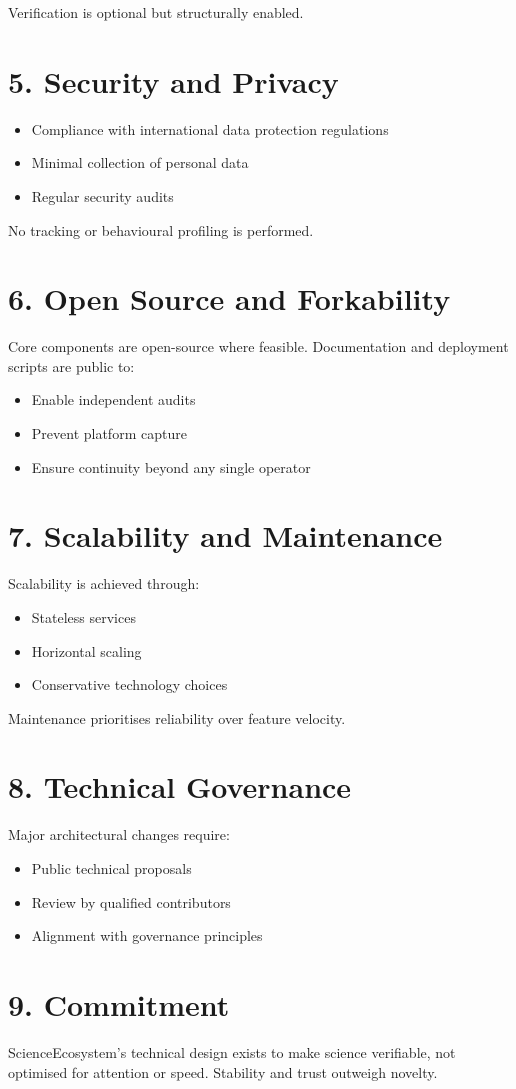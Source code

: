 Verification is optional but structurally enabled.

\section*{5. Security and Privacy}

\begin{itemize}
    \item Compliance with international data protection regulations
    \item Minimal collection of personal data
    \item Regular security audits
\end{itemize}

No tracking or behavioural profiling is performed.

\section*{6. Open Source and Forkability}

Core components are open-source where feasible. Documentation and deployment scripts are public to:
\begin{itemize}
    \item Enable independent audits
    \item Prevent platform capture
    \item Ensure continuity beyond any single operator
\end{itemize}

\section*{7. Scalability and Maintenance}

Scalability is achieved through:
\begin{itemize}
    \item Stateless services
    \item Horizontal scaling
    \item Conservative technology choices
\end{itemize}

Maintenance prioritises reliability over feature velocity.

\section*{8. Technical Governance}

Major architectural changes require:
\begin{itemize}
    \item Public technical proposals
    \item Review by qualified contributors
    \item Alignment with governance principles
\end{itemize}

\section*{9. Commitment}

ScienceEcosystem’s technical design exists to make science verifiable, not optimised for attention or speed. Stability and trust outweigh novelty.


